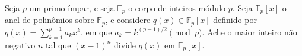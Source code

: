 Seja $p$ um primo ímpar, e seja $\mathbb{F}_p$ o corpo de inteiros módulo $p$. Seja $\mathbb{F}_p[x]$ o anel de polinômios sobre $\mathbb{F}_p$, e considere $q(x) \in \mathbb{F}_p[x]$ definido por $q(x) = \sum_{k=1}^{p-1} a_k x^k$, em que $a_k = k^{(p-1)/2} \pmod{p}$. Ache o maior inteiro não negativo $n$ tal que $(x-1)^n$ divide $q(x)$ em $\mathbb{F}_p[x]$.

